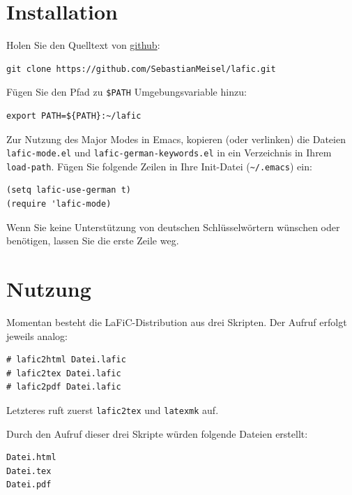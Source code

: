 \documentclass{scrartcl}
\begin{document}
\section{Installation}

Holen Sie den Quelltext von \href{https://github.com}{github}:

\begin{verbatim}
git clone https://github.com/SebastianMeisel/lafic.git

\end{verbatim}

Fügen Sie den Pfad zu \texttt{\$PATH} Umgebungsvariable hinzu:

\begin{verbatim}
export PATH=${PATH}:~/lafic

\end{verbatim}

Zur Nutzung des Major Modes in Emacs, kopieren (oder verlinken) die Dateien \texttt{lafic-mode.el} und \texttt{lafic-german-keywords.el} in ein Verzeichnis in Ihrem \texttt{load-path}. Fügen Sie folgende Zeilen in Ihre Init-Datei (\texttt{\textasciitilde /.emacs}) ein:

\begin{verbatim}
(setq lafic-use-german t)
(require 'lafic-mode)

\end{verbatim}

Wenn Sie keine Unterstützung von deutschen Schlüsselwörtern wünschen oder benötigen, lassen Sie die erste Zeile weg.

\section{Nutzung}

Momentan besteht die LaFiC-Distribution aus drei Skripten. Der Aufruf erfolgt jeweils analog:

\begin{verbatim}
# lafic2html Datei.lafic
# lafic2tex Datei.lafic
# lafic2pdf Datei.lafic

\end{verbatim}

Letzteres ruft zuerst \texttt{lafic2tex} und \texttt{latexmk} auf.

Durch den Aufruf dieser drei Skripte würden folgende Dateien erstellt:

\begin{verbatim}
Datei.html
Datei.tex
Datei.pdf

\end{verbatim}
\end{document}
